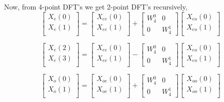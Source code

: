 \documentclass{beamer}
\begin{document}
\begin{frame}
Now, from 4-point DFT's we get 2-point DFT's recursively,
\begin{equation}
\begin{bmatrix}
X_{e}(0) \\ 
X_{e}(1)\\ 
\end{bmatrix}
=
\begin{bmatrix}
X_{ee}(0) \\ 
X_{ee}(1)\\ 
\end{bmatrix}
+
\begin{bmatrix}
W^{0}_{4} & 0\\
0 & W^{1}_{4}
\end{bmatrix}
\begin{bmatrix}
X_{eo}(0) \\ 
X_{eo}(1) \\ 
\end{bmatrix}
\end{equation}


\begin{equation}
\begin{bmatrix}
X_{e}(2) \\ 
X_{e}(3)\\ 
\end{bmatrix}
=
\begin{bmatrix}
X_{ee}(0) \\ 
X_{ee}(1)\\ 
\end{bmatrix}
-
\begin{bmatrix}
W^{0}_{4} & 0\\
0 & W^{1}_{4}
\end{bmatrix}
\begin{bmatrix}
X_{eo}(0) \\ 
X_{eo}(1) \\ 
\end{bmatrix}
\end{equation}


\begin{equation}
\begin{bmatrix}
X_{o}(0) \\ 
X_{o}(1)\\ 
\end{bmatrix}
=
\begin{bmatrix}
X_{oe}(0) \\ 
X_{oe}(1)\\ 
\end{bmatrix}
+
\begin{bmatrix}
W^{0}_{4} & 0\\
0 & W^{1}_{4}
\end{bmatrix}
\begin{bmatrix}
X_{oo}(0) \\ 
X_{oo}(1) \\ 
\end{bmatrix}
\end{equation}



\end{frame}
\end{document}
